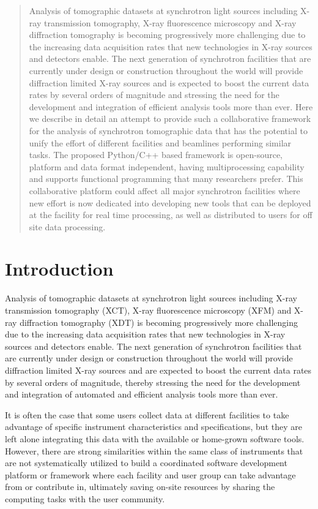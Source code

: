 \documentclass[pdf]{iucr}              %
\begin{document}
\begin{abstract}
Analysis of tomographic datasets at synchrotron light sources including X-ray transmission tomography, X-ray fluorescence microscopy and X-ray diffraction tomography is becoming progressively more challenging due to the increasing data acquisition rates that new technologies in X-ray sources and detectors enable. The next generation of synchrotron facilities that are currently under design or construction throughout the world will provide diffraction limited X-ray sources and is expected to boost the current data rates by several orders of magnitude and stressing the need for the development and integration of efficient analysis tools more than ever. Here we describe in detail an attempt to provide such a collaborative framework for the analysis of synchrotron tomographic data that has the potential to unify the effort of different facilities and beamlines performing similar tasks. The proposed Python/C++ based framework is open-source, platform and data format independent,  having multiprocessing capability and supports functional programming that many researchers prefer. This collaborative platform could affect all major synchrotron facilities where new effort is now dedicated into developing new tools that can be deployed at the facility for real time processing, as well as distributed to users for off site data processing.
\end{abstract}


\section{Introduction}

Analysis of tomographic datasets at synchrotron light sources including X-ray transmission tomography (XCT), X-ray fluorescence microscopy (XFM) and X-ray diffraction tomography (XDT) is becoming progressively more challenging  due to the increasing data acquisition rates that new technologies in X-ray sources and detectors enable. The next generation of synchrotron facilities that are currently under design or construction throughout the world will provide diffraction limited X-ray sources and are expected to boost the current data rates by several orders of magnitude, thereby stressing the need for the development and integration of automated and efficient analysis tools more than ever. 

It is often the case that some users collect data at different facilities to take advantage of specific instrument characteristics and specifications, but they are left alone integrating this data with the available or home-grown software tools. However, there are strong similarities within the same class of instruments that are not systematically utilized to build a coordinated software development platform or framework where each facility and user group can take advantage from or contribute in, ultimately saving on-site resources by sharing the computing tasks with the user community. 
\end{document}
